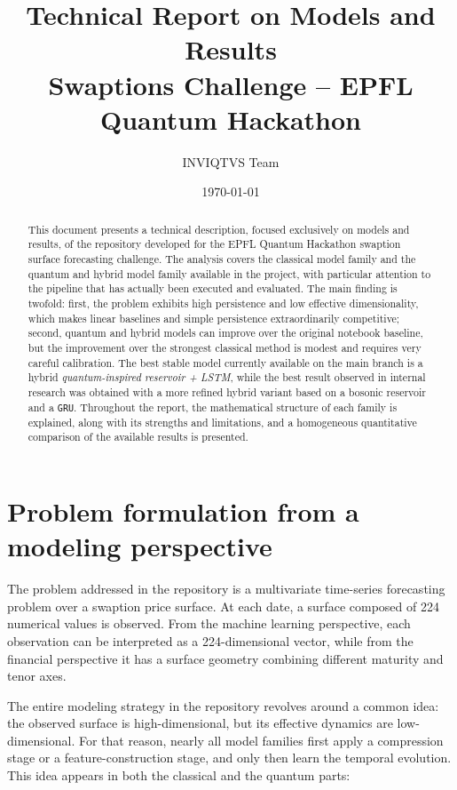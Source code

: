 \documentclass[11pt,a4paper]{article}
\title{\vspace{-1.2cm}\textbf{Technical Report on Models and Results}\\[0.4em]
\large Swaptions Challenge -- EPFL Quantum Hackathon}
\author{INVIQTVS Team}
\date{\today}
\begin{document}
\maketitle
\vspace{-1.0em}

\begin{abstract}
This document presents a technical description, focused exclusively on models and results, of the repository developed for the EPFL Quantum Hackathon swaption surface forecasting challenge. The analysis covers the classical model family and the quantum and hybrid model family available in the project, with particular attention to the pipeline that has actually been executed and evaluated. The main finding is twofold: first, the problem exhibits high persistence and low effective dimensionality, which makes linear baselines and simple persistence extraordinarily competitive; second, quantum and hybrid models can improve over the original notebook baseline, but the improvement over the strongest classical method is modest and requires very careful calibration. The best stable model currently available on the main branch is a hybrid \textit{quantum-inspired reservoir + LSTM}, while the best result observed in internal research was obtained with a more refined hybrid variant based on a bosonic reservoir and a \texttt{GRU}. Throughout the report, the mathematical structure of each family is explained, along with its strengths and limitations, and a homogeneous quantitative comparison of the available results is presented.
\end{abstract}

\tableofcontents
\newpage

\section{Problem formulation from a modeling perspective}

The problem addressed in the repository is a multivariate time-series forecasting problem over a swaption price surface. At each date, a surface composed of 224 numerical values is observed. From the machine learning perspective, each observation can be interpreted as a 224-dimensional vector, while from the financial perspective it has a surface geometry combining different maturity and tenor axes.

The entire modeling strategy in the repository revolves around a common idea: the observed surface is high-dimensional, but its effective dynamics are low-dimensional. For that reason, nearly all model families first apply a compression stage or a feature-construction stage, and only then learn the temporal evolution. This idea appears in both the classical and the quantum parts:
\end{document}
